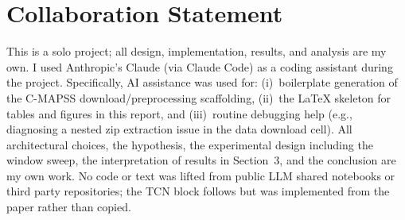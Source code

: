 \documentclass{article}
\begin{document}
\section*{Collaboration Statement}

This is a solo project; all design, implementation, results, and analysis are my own. I used Anthropic's Claude (via Claude Code) as a coding assistant during the project. Specifically, AI assistance was used for: (i)~boilerplate generation of the C-MAPSS download/preprocessing scaffolding, (ii)~the LaTeX skeleton for tables and figures in this report, and (iii)~routine debugging help (e.g., diagnosing a nested zip extraction issue in the data download cell). All architectural choices, the hypothesis, the experimental design including the window sweep, the interpretation of results in Section~3, and the conclusion are my own work. No code or text was lifted from public LLM shared notebooks or third party repositories; the TCN block follows \citet{bai2018tcn} but was implemented from the paper rather than copied.




\end{document}
